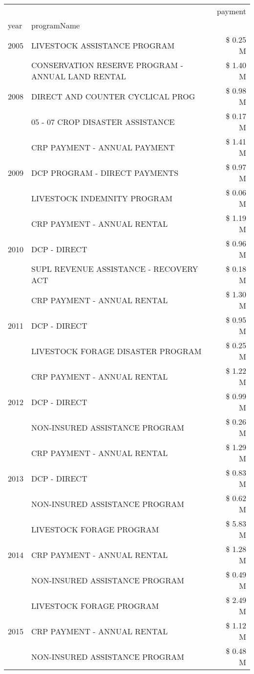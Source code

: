\begin{tabular}{llr}
\toprule
 &  & payment \\
year & programName &  \\
\midrule
2005 & LIVESTOCK ASSISTANCE PROGRAM & \$ 0.25 M \\
\cline{1-3}
\multirow[t]{3}{*}{2008} & CONSERVATION RESERVE PROGRAM - ANNUAL LAND RENTAL & \$ 1.40 M \\
 & DIRECT AND COUNTER CYCLICAL PROG & \$ 0.98 M \\
 & 05 - 07 CROP DISASTER ASSISTANCE & \$ 0.17 M \\
\cline{1-3}
\multirow[t]{3}{*}{2009} & CRP PAYMENT - ANNUAL PAYMENT & \$ 1.41 M \\
 & DCP PROGRAM - DIRECT PAYMENTS & \$ 0.97 M \\
 & LIVESTOCK INDEMNITY PROGRAM & \$ 0.06 M \\
\cline{1-3}
\multirow[t]{3}{*}{2010} & CRP PAYMENT - ANNUAL RENTAL & \$ 1.19 M \\
 & DCP - DIRECT & \$ 0.96 M \\
 & SUPL REVENUE ASSISTANCE - RECOVERY ACT & \$ 0.18 M \\
\cline{1-3}
\multirow[t]{3}{*}{2011} & CRP PAYMENT - ANNUAL RENTAL & \$ 1.30 M \\
 & DCP - DIRECT & \$ 0.95 M \\
 & LIVESTOCK FORAGE DISASTER PROGRAM & \$ 0.25 M \\
\cline{1-3}
\multirow[t]{3}{*}{2012} & CRP PAYMENT - ANNUAL RENTAL & \$ 1.22 M \\
 & DCP - DIRECT & \$ 0.99 M \\
 & NON-INSURED ASSISTANCE PROGRAM & \$ 0.26 M \\
\cline{1-3}
\multirow[t]{3}{*}{2013} & CRP PAYMENT - ANNUAL RENTAL & \$ 1.29 M \\
 & DCP - DIRECT & \$ 0.83 M \\
 & NON-INSURED ASSISTANCE PROGRAM & \$ 0.62 M \\
\cline{1-3}
\multirow[t]{3}{*}{2014} & LIVESTOCK FORAGE PROGRAM & \$ 5.83 M \\
 & CRP PAYMENT - ANNUAL RENTAL & \$ 1.28 M \\
 & NON-INSURED ASSISTANCE PROGRAM & \$ 0.49 M \\
\cline{1-3}
\multirow[t]{3}{*}{2015} & LIVESTOCK FORAGE PROGRAM & \$ 2.49 M \\
 & CRP PAYMENT - ANNUAL RENTAL & \$ 1.12 M \\
 & NON-INSURED ASSISTANCE PROGRAM & \$ 0.48 M \\

\end{tabular}
